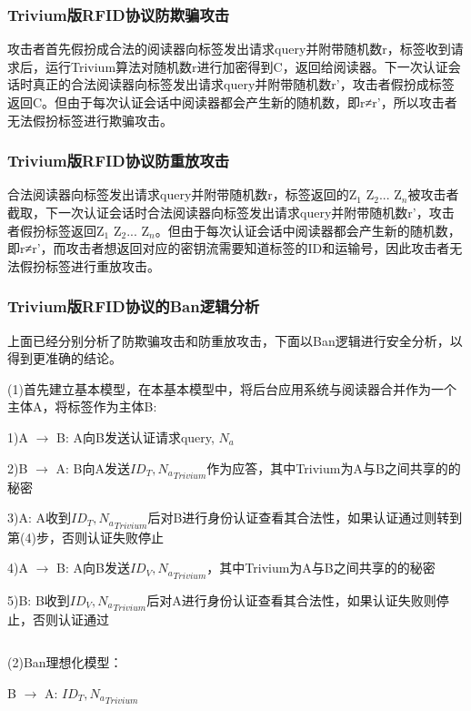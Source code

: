 \subsubsection{Trivium版RFID协议防欺骗攻击}

攻击者首先假扮成合法的阅读器向标签发出请求query并附带随机数r，标签收到请求后，运行Trivium算法对随机数r进行加密得到C，返回给阅读器。下一次认证会话时真正的合法阅读器向标签发出请求query并附带随机数r’，攻击者假扮成标签返回C。但由于每次认证会话中阅读器都会产生新的随机数，即r≠r’，所以攻击者无法假扮标签进行欺骗攻击。

\subsubsection{Trivium版RFID协议防重放攻击}

合法阅读器向标签发出请求query并附带随机数r，标签返回的Z$_{1}$ Z$_{2}$... Z$_{n}$被攻击者截取，下一次认证会话时合法阅读器向标签发出请求query并附带随机数r’，攻击者假扮标签返回Z$_{1}$ Z$_{2}$... Z$_{n}$。但由于每次认证会话中阅读器都会产生新的随机数，即r≠r’，而攻击者想返回对应的密钥流需要知道标签的ID和运输号，因此攻击者无法假扮标签进行重放攻击。

\subsubsection{Trivium版RFID协议的Ban逻辑分析}

上面已经分别分析了防欺骗攻击和防重放攻击，下面以Ban逻辑进行安全分析，以得到更准确的结论。

(1)首先建立基本模型，在本基本模型中，将后台应用系统与阅读器合并作为一个主体A，将标签作为主体B:

1)A $\rightarrow$ B: A向B发送认证请求{query, $N_{a}$}

2)B $\rightarrow$ A: B向A发送${ID_{T}, N_{a}}_{Trivium}$作为应答，其中Trivium为A与B之间共享的的秘密

3)A: A收到${ID_{T}, N_{a}}_{Trivium}$后对B进行身份认证查看其合法性，如果认证通过则转到第(4)步，否则认证失败停止

4)A $\rightarrow$ B: A向B发送${ID_{V}, N_{a}}_{Trivium}$，其中Trivium为A与B之间共享的的秘密

5)B: B收到${ID_{V}, N_{a}}_{Trivium}$后对A进行身份认证查看其合法性，如果认证失败则停止，否则认证通过

\[\]

(2)Ban理想化模型：

B $\rightarrow$ A: ${ID_{T}, N_{a}}_{Trivium}$

